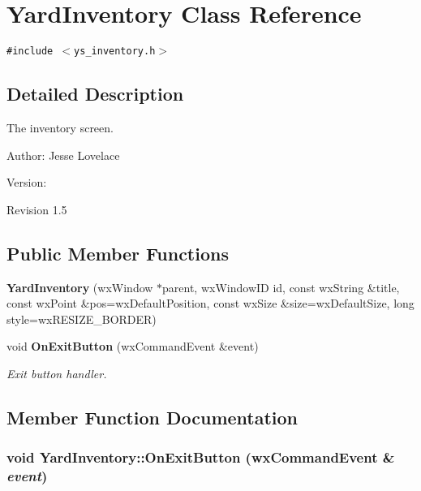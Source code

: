 \section{Yard\-Inventory Class Reference}
\label{classYardInventory}
{\tt \#include $<$ys\_\-inventory.h$>$}



\subsection{Detailed Description}
The inventory screen. 

\begin{Desc}
\item[Author:]Jesse Lovelace \end{Desc}
\begin{Desc}
\item[Version:]\begin{Desc}
\item[Revision]1.5 \end{Desc}
\end{Desc}


\subsection*{Public Member Functions}
\begin{CompactItemize}
\item 
{\bf Yard\-Inventory} (wx\-Window $\ast$parent, wx\-Window\-ID id, const wx\-String \&title, const wx\-Point \&pos=wx\-Default\-Position, const wx\-Size \&size=wx\-Default\-Size, long style=wx\-RESIZE\_\-BORDER)\label{classYardInventory_a0}

\item 
void {\bf On\-Exit\-Button} (wx\-Command\-Event \&event)
\begin{CompactList}\small\item\em Exit button handler. \item\end{CompactList}\end{CompactItemize}


\subsection{Member Function Documentation}
\subsubsection{\setlength{\rightskip}{0pt plus 5cm}void Yard\-Inventory::On\-Exit\-Button (wx\-Command\-Event \& {\em event})}\label{classYardInventory_a2}


